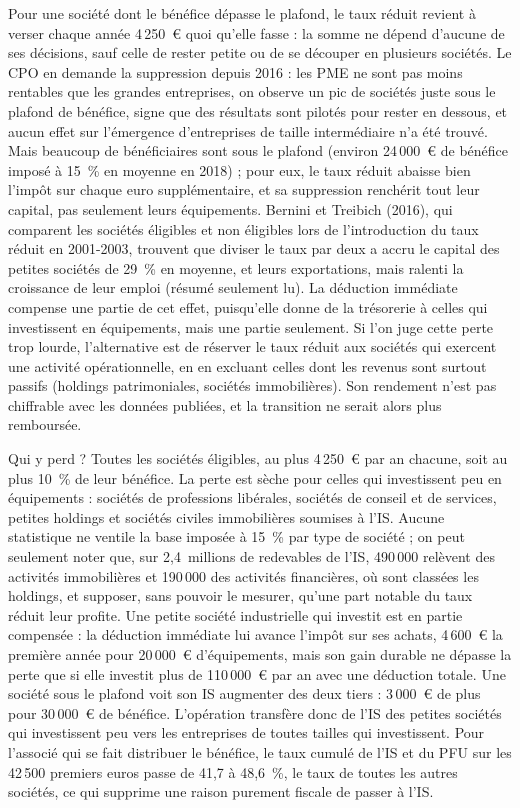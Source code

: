 \documentclass[11pt,a4paper]{article}
\begin{document}
Pour une société dont le bénéfice dépasse le plafond, le taux réduit revient à verser chaque année
4\,250~€ quoi qu'elle fasse : la somme ne dépend d'aucune de ses décisions, sauf celle de rester petite ou de
se découper en plusieurs sociétés. Le CPO en demande la suppression depuis 2016 : les PME ne sont pas moins
rentables que les grandes entreprises, on observe un pic de sociétés juste sous le plafond de bénéfice, signe
que des résultats sont pilotés pour rester en dessous, et aucun effet sur l'émergence d'entreprises de taille
intermédiaire n'a été trouvé. Mais beaucoup de bénéficiaires sont sous le plafond (environ 24\,000~€ de
bénéfice imposé à 15~\% en moyenne en 2018) ; pour eux, le taux réduit abaisse bien l'impôt sur chaque euro
supplémentaire, et sa suppression renchérit tout leur capital, pas seulement leurs équipements. Bernini et
Treibich (2016), qui comparent les sociétés éligibles et non éligibles lors de l'introduction du taux réduit en
2001-2003, trouvent que diviser le taux par deux a accru le capital des petites sociétés de 29~\% en moyenne,
et leurs exportations, mais ralenti la croissance de leur emploi (résumé seulement lu). La déduction
immédiate compense une partie de cet effet, puisqu'elle donne de la trésorerie à celles qui investissent en
équipements, mais une partie seulement. Si l'on juge cette perte trop lourde, l'alternative est de réserver
le taux réduit aux sociétés qui exercent une activité opérationnelle, en en excluant celles dont les revenus
sont surtout passifs (holdings patrimoniales, sociétés immobilières). Son rendement n'est pas chiffrable avec
les données publiées, et la transition ne serait alors plus remboursée.

Qui y perd ? Toutes les sociétés éligibles, au plus 4\,250~€ par an chacune, soit au plus 10~\% de leur
bénéfice. La perte
est sèche pour celles qui investissent peu en équipements : sociétés de professions libérales, sociétés de
conseil et de services, petites holdings et sociétés civiles immobilières soumises à l'IS. Aucune
statistique ne ventile la base imposée à 15~\% par type de société ; on peut seulement noter que, sur
2,4~millions de redevables de l'IS, 490\,000 relèvent des activités immobilières et 190\,000 des activités
financières, où sont classées les holdings, et supposer, sans pouvoir le mesurer, qu'une part notable du
taux réduit leur profite. Une petite société industrielle qui investit est en partie compensée : la
déduction immédiate lui avance l'impôt sur ses achats, 4\,600~€ la première année pour 20\,000~€
d'équipements, mais son gain durable ne dépasse la perte que si elle investit plus de 110\,000~€ par an avec une déduction
totale. Une société sous le plafond voit son IS augmenter des deux tiers : 3\,000~€ de plus pour 30\,000~€ de
bénéfice.
L'opération transfère donc de l'IS des petites sociétés qui investissent peu vers les entreprises de toutes
tailles qui investissent. Pour l'associé qui se fait distribuer le bénéfice, le taux cumulé de l'IS et du PFU
sur les 42\,500 premiers euros passe de 41,7 à 48,6~\%, le taux de toutes les autres sociétés, ce qui supprime
une raison purement fiscale de passer à l'IS.
\end{document}
